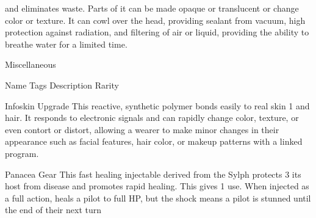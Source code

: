 and eliminates waste. Parts of it can be made opaque or translucent or change color or texture. It can cowl  
over the head, providing sealant from vacuum, high protection against radiation, and filtering of air or  
liquid, providing the ability to breathe water for a limited time.
 

                                                       Miscellaneous  

  Name           Tags            Description                                                              Rarity 

                                                                                                                           


Infoskin        Upgrade        This reactive, synthetic polymer bonds easily to real skin               1 
                                and hair. It responds to electronic signals and can rapidly  
                                change color, texture, or even contort or distort, allowing a  
                               wearer to make minor changes in their appearance such as  
                               facial features, hair color, or makeup patterns with a linked  
                                program. 

Panacea         Gear           This fast healing injectable derived from the Sylph protects             3 
                                its host from disease and promotes rapid healing. This  
                                gives 1 use. When injected as a full action, heals a pilot to  
                               full HP, but the shock means a pilot is stunned until the end  
                                of their next turn 
